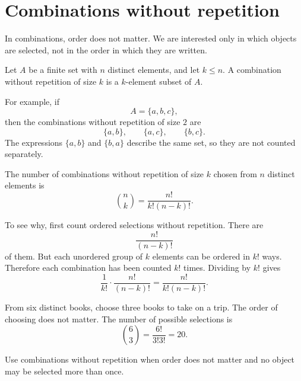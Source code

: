 \section{Combinations without repetition}

In combinations, order does not matter. We are interested only in which objects are selected, not in the order in which they are written.

\begin{definitionbox}
Let \(A\) be a finite set with \(n\) distinct elements, and let \(k\leq n\). A combination without repetition of size \(k\) is a \(k\)-element subset of \(A\).
\end{definitionbox}

For example, if
\[
A=\{a,b,c\},
\]
then the combinations without repetition of size \(2\) are
\[
\{a,b\},\qquad \{a,c\},\qquad \{b,c\}.
\]
The expressions \(\{a,b\}\) and \(\{b,a\}\) describe the same set, so they are not counted separately.

\begin{center}
\end{center}

\begin{theorembox}
The number of combinations without repetition of size \(k\) chosen from \(n\) distinct elements is
\[
\binom{n}{k}=\frac{n!}{k!(n-k)!}.
\]
\end{theorembox}

To see why, first count ordered selections without repetition. There are
\[
\frac{n!}{(n-k)!}
\]
of them. But each unordered group of \(k\) elements can be ordered in \(k!\) ways. Therefore each combination has been counted \(k!\) times. Dividing by \(k!\) gives
\[
\frac{1}{k!}\cdot \frac{n!}{(n-k)!}=\frac{n!}{k!(n-k)!}.
\]

\begin{examplebox}
From six distinct books, choose three books to take on a trip. The order of choosing does not matter. The number of possible selections is
\[
\binom{6}{3}=\frac{6!}{3!3!}=20.
\]
\end{examplebox}

\begin{remarkbox}
Use combinations without repetition when order does not matter and no object may be selected more than once.
\end{remarkbox}
